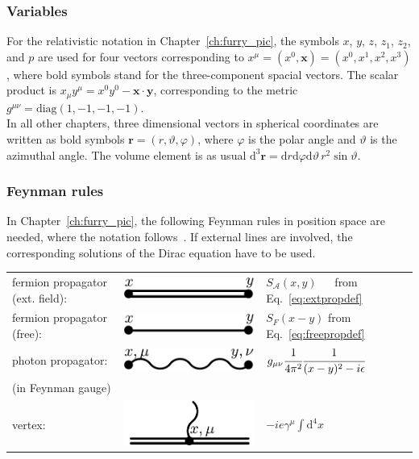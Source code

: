 \subsubsection*{Variables}
For the relativistic notation in Chapter~\ref{ch:furry_pic}, the symbols $x$, $y$, $z$, $z_1$, $z_2$, and $p$ are used for four vectors corresponding to $x^\mu=(x^0,\mathbf{x})=(x^0,x^1,x^2,x^3)$, where bold symbols stand for the three-component spacial vectors. The scalar product is $x_\mu y^\mu = x^0 y^0 - \mathbf{x}\cdot\mathbf{y}$, corresponding to the metric $g^{\mu\nu}=\text{diag}(1,-1,-1,-1)$.\\
In all other chapters, three dimensional vectors in spherical coordinates are written as bold symbols $\mathbf{r}=(r,\vartheta,\varphi)$, where $\varphi$ is the polar angle and $\vartheta$ is the azimuthal angle. The volume element is as usual $\text{d}^3\mathbf{r}=\text{d}r\text{d}\varphi\text{d}\vartheta\, r^2 \sin\vartheta $.
\subsubsection*{Feynman rules}
In Chapter~\ref{ch:furry_pic}, the following Feynman rules in position space are needed, where the notation follows~\cite{itzykson2005}. If external lines are involved, the corresponding solutions of the Dirac equation have to be used.\\

\begin{tabular}{lll}
fermion propagator (ext. field):&\includegraphics[width=0.2\linewidth]{pics/feynrule_1.pdf} & $S_{\mathcal{A}}(x,y)\phantom{-}$ from Eq.~\eqref{eq:extpropdef}\\[7pt]
fermion propagator (free):&\includegraphics[width=0.2\linewidth]{pics/feynrule_2.pdf} &$S_{F}(x-y)$ from Eq.~\eqref{eq:freepropdef}\\[7pt]
photon propagator:\vspace{-7pt}&\includegraphics[width=0.2\linewidth]{pics/feynrule_3.pdf} &$g_{\mu\nu}\cfrac{1}{4\pi^2}\cfrac{1}{(x-y)^2-i\epsilon}$\\
(in Feynman gauge)\vspace{-7pt}\\
vertex:&\includegraphics[width=0.2\linewidth]{pics/feynrule_4.pdf} &$-ie\gamma^\mu\int\text{d}^4x$
\end{tabular}
